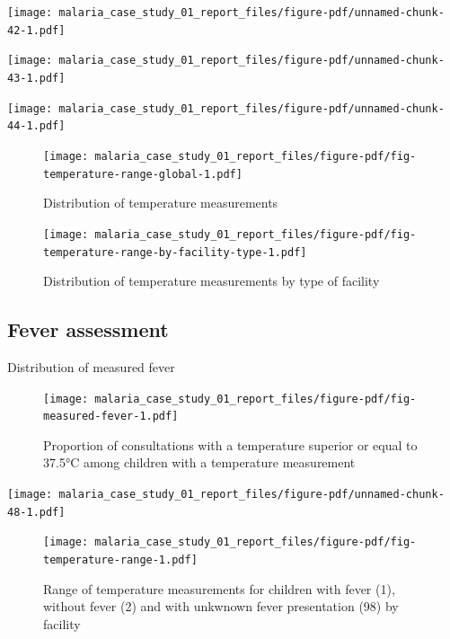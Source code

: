 \documentclass[
  letterpaper,
  DIV=11,
  numbers=noendperiod,
  oneside]{scrreprt}
\begin{document}
\texttt{[image: malaria\_case\_study\_01\_report\_files/figure-pdf/unnamed-chunk-42-1.pdf]}

\texttt{[image: malaria\_case\_study\_01\_report\_files/figure-pdf/unnamed-chunk-43-1.pdf]}

\texttt{[image: malaria\_case\_study\_01\_report\_files/figure-pdf/unnamed-chunk-44-1.pdf]}

\begin{figure}

{\centering \texttt{[image: malaria\_case\_study\_01\_report\_files/figure-pdf/fig-temperature-range-global-1.pdf]}

}

\caption{\label{fig-temperature-range-global}Distribution of temperature
measurements}

\end{figure}

\begin{figure}

{\centering \texttt{[image: malaria\_case\_study\_01\_report\_files/figure-pdf/fig-temperature-range-by-facility-type-1.pdf]}

}

\caption{\label{fig-temperature-range-by-facility-type}Distribution of
temperature measurements by type of facility}

\end{figure}

\hypertarget{fever-assessment-1}{%
\subsection{Fever assessment}\label{fever-assessment-1}}

Distribution of measured fever

\begin{figure}

{\centering \texttt{[image: malaria\_case\_study\_01\_report\_files/figure-pdf/fig-measured-fever-1.pdf]}

}

\caption{\label{fig-measured-fever}Proportion of consultations with a
temperature superior or equal to 37.5°C among children with a
temperature measurement}

\end{figure}

\texttt{[image: malaria\_case\_study\_01\_report\_files/figure-pdf/unnamed-chunk-48-1.pdf]}

\begin{figure}

{\centering \texttt{[image: malaria\_case\_study\_01\_report\_files/figure-pdf/fig-temperature-range-1.pdf]}

}

\caption{\label{fig-temperature-range}Range of temperature measurements
for children with fever (1), without fever (2) and with unkwnown fever
presentation (98) by facility}

\end{figure}
\end{document}
